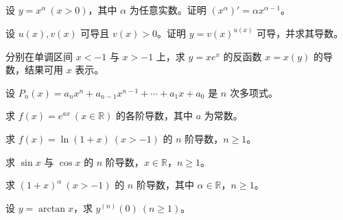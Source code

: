 \noindent\begin{minipage}{\textwidth}
设 $y=x^\alpha\ (x>0)$，其中 $\alpha$ 为任意实数。证明 $(x^\alpha)'=\alpha x^{\alpha-1}$。
\end{minipage}\par\vfill
\newpage
\noindent\begin{minipage}{\textwidth}
设 $u(x),v(x)$ 可导且 $v(x)>0$。证明 $y=v(x)^{u(x)}$ 可导，并求其导数。
\end{minipage}\par\vfill
\noindent\begin{minipage}{\textwidth}
分别在单调区间 $x<-1$ 与 $x>-1$ 上，求 $y=xe^x$ 的反函数 $x=x(y)$ 的导数，结果可用 $x$ 表示。
\end{minipage}\par\vfill
\noindent\begin{minipage}{\textwidth}
设 $P_n(x)=a_nx^n+a_{n-1}x^{n-1}+\cdots+a_1x+a_0$ 是 $n$ 次多项式。
\end{minipage}\par\vfill
\noindent\begin{minipage}{\textwidth}
求 $f(x)=e^{ax}\ (x\in\mathbb R)$ 的各阶导数，其中 $a$ 为常数。
\end{minipage}\par\vfill
\newpage
\noindent\begin{minipage}{\textwidth}
求 $f(x)=\ln(1+x)\ (x>-1)$ 的 $n$ 阶导数，$n\ge1$。
\end{minipage}\par\vfill
\noindent\begin{minipage}{\textwidth}
求 $\sin x$ 与 $\cos x$ 的 $n$ 阶导数，$x\in\mathbb R$，$n\ge1$。
\end{minipage}\par\vfill
\noindent\begin{minipage}{\textwidth}
求 $(1+x)^\alpha\ (x>-1)$ 的 $n$ 阶导数，其中 $\alpha\in\mathbb R$，$n\ge1$。
\end{minipage}\par\vfill
\noindent\begin{minipage}{\textwidth}
设 $y=\arctan x$，求 $y^{(n)}(0)\ (n\ge1)$。
\end{minipage}\par\vfill
